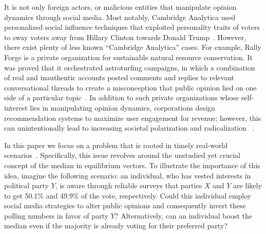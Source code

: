 It is not only foreign actors, or malicious entities that manipulate opinion dynamics through  social media. Most notably, Cambridge Analytica used personalized social influence techniques that  exploited personality traits of voters to sway voters away from Hillary Clinton towards Donald Trump~\cite{nix}.  However, there exist plenty of less known ``Cambridge Analytica'' cases. For example, Rally Forge is a private organization for sustainable natural resource conservation. It was proved that it orchestrated astroturfing campaigns, in which a combination of real and inauthentic accounts posted comments and replies to relevant conversational threads to create a misconception that public opinion lied on one side of a particular topic~\cite{astroturf}. In addition to such private organizations whose self-interest lies in manipulating opinion dynamics,    corporations design recommendation systems to maximize user engagement for revenue; however, this can unintentionally lead to increasing societal polarization and radicalization ~\cite{ledwich2019algorithmic}. 



In this paper we focus on a problem that is rooted in timely real-world scenarios~\cite{nix,haidt2019dark,mcnamee2020zucked,abramowitz2015all,usjustice}. Specifically, this issue revolves around the unstudied yet crucial concept of the median in equilibrium vectors. To illustrate the importance of this idea, imagine the following scenario: an individual, who has vested interests in political party $Y$, is aware through reliable surveys that parties $X$ and $Y$ are likely to get 50.1\% and 49.9\% of the vote, respectively. Could this individual employ social media strategies to alter public opinions and consequently invert these polling numbers in favor of party $Y$?  Alternatively, can an individual boost the median even if the majority is already voting for their preferred party?

